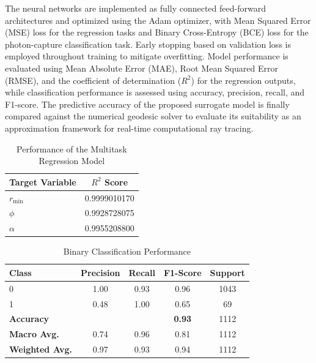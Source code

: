\documentclass[12pt]{article}
\begin{document}
\begin{itemize}
The neural networks are implemented as fully connected feed-forward architectures and optimized using the Adam optimizer, with Mean Squared Error (MSE) loss for the regression tasks and Binary Cross-Entropy (BCE) loss for the photon-capture classification task. Early stopping based on validation loss is employed throughout training to mitigate overfitting. Model performance is evaluated using Mean Absolute Error (MAE), Root Mean Squared Error (RMSE), and the coefficient of determination ($R^2$) for the regression outputs, while classification performance is assessed using accuracy, precision, recall, and F1-score. The predictive accuracy of the proposed surrogate model is finally compared against the numerical geodesic solver to evaluate its suitability as an approximation framework for real-time computational ray tracing.

\begin{table}[htbp]
\centering
\caption{Performance of the Multitask Regression Model}
\label{tab:multitask_regression}
\begin{tabular}{lc}
\hline
\textbf{Target Variable} & \textbf{$R^2$ Score} \\
\hline
$r_{\min}$ & 0.9999010170 \\
$\phi$    & 0.9928728075 \\
$\alpha$  & 0.9955208800 \\
\hline
\end{tabular}
\end{table}

\begin{table}[htbp]
\centering
\caption{Binary Classification Performance}
\label{tab:classification}
\begin{tabular}{lcccc}
\hline
\textbf{Class} & \textbf{Precision} & \textbf{Recall} & \textbf{F1-Score} & \textbf{Support} \\
\hline
0 & 1.00 & 0.93 & 0.96 & 1043 \\
1 & 0.48 & 1.00 & 0.65 & 69 \\
\hline
\textbf{Accuracy} & & & \textbf{0.93} & 1112 \\
\textbf{Macro Avg.} & 0.74 & 0.96 & 0.81 & 1112 \\
\textbf{Weighted Avg.} & 0.97 & 0.93 & 0.94 & 1112 \\
\hline
\end{tabular}
\end{table}



\end{itemize}
\end{document}
